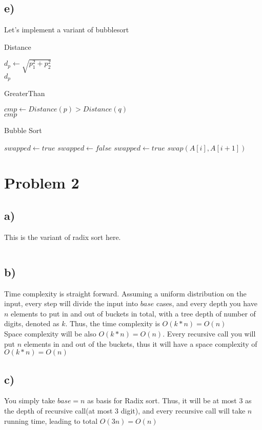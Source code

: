 \documentclass{article}
\begin{document}
\subsection*{e)}
Let's implement a variant of bubblesort
\begin{algorithm}
    \caption{Distance}
    \label{Distance}
    \begin{algorithmic}[1]
        \State $d_{p} \gets \sqrt{p_1^2 + p_2^2}$ \\
        \Return $d_{p}$
        \EndProcedure
    \end{algorithmic}
\end{algorithm}
\begin{algorithm}
    \caption{GreaterThan}
    \label{GreaterThan}
    \begin{algorithmic}[1]
        \State $cmp \gets Distance(p) > Distance(q)$ \\
        \Return $cmp$
        \EndProcedure
    \end{algorithmic}
\end{algorithm}

\begin{algorithm}
    \caption{Bubble Sort}
    \label{bubblesort}
    \begin{algorithmic}[1]
        \State $swapped \gets true$
        \State $swapped \gets false$
        \State $swapped \gets true$
        \State $swap(A[i], A[i + 1])$
        \EndIf
        \EndFor
        \EndWhile
        \EndProcedure
    \end{algorithmic}
\end{algorithm}
\section*{Problem 2}
\subsection*{a)}
This is the variant of radix sort here.
\inputminted{Python}{radix_sort.py}
\subsection*{b)}
Time complexity is straight forward. Assuming a uniform
distribution on the input, every step will divide the input
into $base$ cases, and every depth you have $n$ elements to put in and out
of buckets in total, with
a tree depth of number of digits, denoted as $k$. Thus, the
time complexity is $O(k * n) = O(n)$ \\
Space complexity will be also $O(k * n) = O(n)$. Every recursive call
you will put $n$ elements in and out of the buckets, thus
it will have a space complexity of $O(k * n) = O(n)$
\subsection*{c)}
You simply take $base = n$ as basis for Radix sort. Thus, it will 
be at most $3$ as the depth of recursive call(at most 3 digit), and every
recursive call will take $n$ running time, leading to total
$O(3n) = O(n)$
\end{document}
